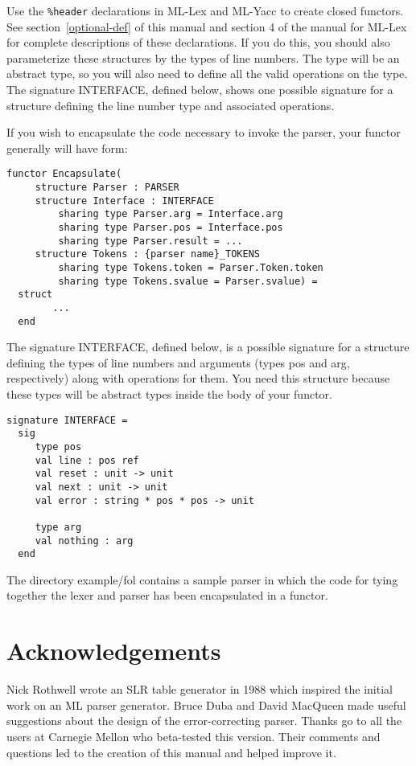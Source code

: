 Use the {\tt \%header} declarations in ML-Lex and ML-Yacc to create
closed functors.  See section~\ref{optional-def} of this manual
and section 4 of the manual for ML-Lex for complete descriptions of these
declarations.  If you do this, you should also parameterize these
structures by the types of line numbers.  The type will be an
abstract type, so you will also need to define all the valid
operations on the type.  The signature INTERFACE, defined below,
shows one possible signature for a structure defining the line
number type and associated operations.

If you wish to encapsulate the code necessary to invoke the
parser, your functor generally will have form:
\begin{tt}
\begin{verbatim}
functor Encapsulate(
     structure Parser : PARSER
     structure Interface : INTERFACE
         sharing type Parser.arg = Interface.arg
         sharing type Parser.pos = Interface.pos
         sharing type Parser.result = ...
     structure Tokens : {parser name}_TOKENS
         sharing type Tokens.token = Parser.Token.token
         sharing type Tokens.svalue = Parser.svalue) =
  struct
        ...
  end
\end{verbatim}
\end{tt}

The signature INTERFACE, defined below, is a possible signature for
a structure
defining the types
of line numbers and arguments (types pos and arg, respectively)
along with operations for them.  You need this structure
because
these types will be abstract types inside the body of your
functor.
\begin{tt}
\begin{verbatim}
signature INTERFACE = 
  sig
     type pos
     val line : pos ref
     val reset : unit -> unit
     val next : unit -> unit
     val error : string * pos * pos -> unit

     type arg
     val nothing : arg
  end
\end{verbatim}
\end{tt}

The directory example/fol contains a sample parser in which
the code for tying together the lexer and parser has been
encapsulated in a functor.

\section{Acknowledgements}

Nick Rothwell wrote an SLR table generator in 1988 which inspired the
initial work on an ML parser generator.  Bruce Duba and David
MacQueen made useful suggestions about the design of the error-correcting
parser.  Thanks go to all the users at Carnegie Mellon who beta-tested
this version.  Their comments and questions led to the creation of
this manual and helped improve it.

